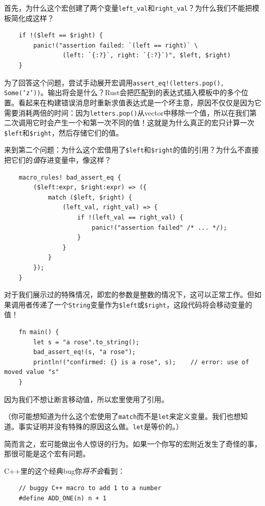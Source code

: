 首先，为什么这个宏创建了两个变量\texttt{left\_val}和\texttt{right\_val}？为什么我们不能把模板简化成这样？
\begin{verbatim}
    if !($left == $right) {
        panic!("assertion failed: `(left == right)` \
                (left: `{:?}`, right: `{:?}`)", $left, $right)
    }
\end{verbatim}
为了回答这个问题，尝试手动展开宏调用\texttt{assert\_eq!(letters.pop(), Some('z'))}。输出将会是什么？Rust会把匹配到的表达式插入模板中的多个位置。看起来在构建错误消息时重新求值表达式是一个坏主意，原因不仅仅是因为它需要消耗两倍的时间：因为\texttt{letters.pop()}从vector中移除一个值，所以在我们第二次调用它时会产生一个和第一次不同的值！这就是为什么真正的宏只计算一次\texttt{\$left}和\texttt{\$right}，然后存储它们的值。

来到第二个问题：为什么这个宏借用了\texttt{\$left}和\texttt{\$right}的值的引用？为什么不直接把它们的\emph{值}存进变量中，像这样？
\begin{verbatim}
    macro_rules! bad_assert_eq {
        ($left:expr, $right:expr) => ({
            match ($left, $right) {
                (left_val, right_val) => {
                    if !(left_val == right_val) {
                        panic!("assertion failed" /* ... */);
                    }
                }
            }
        });
    }
\end{verbatim}

对于我们展示过的特殊情况，即宏的参数是整数的情况下，这可以正常工作。但如果调用者传递了一个\texttt{String}变量作为\texttt{\$left}或\texttt{\$right}，这段代码将会移动变量的值！
\begin{verbatim}
    fn main() {
        let s = "a rose".to_string();
        bad_assert_eq!(s, "a rose");
        println!("confirmed: {} is a rose", s);    // error: use of moved value "s"
    }
\end{verbatim}

因为我们不想让断言移动值，所以宏里使用了引用。

（你可能想知道为什么这个宏使用了\texttt{match}而不是\texttt{let}来定义变量。我们也想知道。事实证明并没有特殊的原因这么做。\texttt{let}是等价的。）

简而言之，宏可能做出令人惊讶的行为。如果一个你写的宏附近发生了奇怪的事，那很可能是这个宏有问题。

C++里的这个经典bug你\emph{将不会}看到：
\begin{verbatim}
    // buggy C++ macro to add 1 to a number
    #define ADD_ONE(n) n + 1
\end{verbatim}

